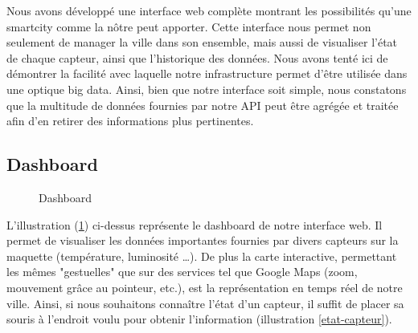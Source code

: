 Nous avons développé une interface web complète montrant les possibilités qu’une smartcity comme la nôtre peut apporter. Cette interface nous permet non seulement de manager la ville dans son ensemble, mais aussi de visualiser l’état de chaque capteur, ainsi que l’historique des données. Nous avons tenté ici de démontrer la facilité avec laquelle notre infrastructure permet d’être utilisée dans une optique big data. Ainsi, bien que notre interface soit simple, nous constatons que la multitude de données fournies par notre API peut être agrégée et traitée afin d’en retirer des informations plus pertinentes.

\subsection{Dashboard}
\begin{figure}[H]
    \begin{center}

        \caption{Dashboard} \label{dashboard}
    \end{center}
\end{figure}
L’illustration (\ref{dashboard}) ci-dessus représente le dashboard de notre interface web. Il permet de visualiser les données importantes fournies par divers capteurs sur la maquette (température, luminosité …). De plus la carte interactive, permettant les mêmes "gestuelles" que sur des services tel que Google Maps (zoom, mouvement grâce au pointeur, etc.), est la représentation en temps réel de notre ville. Ainsi, si nous souhaitons connaître l’état d’un capteur, il suffit de placer sa souris à l’endroit voulu pour obtenir l’information (illustration \ref{etat-capteur}).
